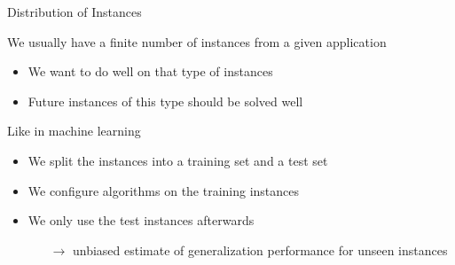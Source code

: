 \begin{frame}[c]{Distribution of Instances}

We usually have a finite number of instances from a given application
\begin{itemize}
\item We want to do well on that type of instances
\item Future instances of this type should be solved well 
\end{itemize}

\pause
\bigskip

Like in machine learning
\begin{itemize}
\item We split the instances into a \alert{training set} and a \alert{test set}
\item We configure algorithms on the training instances
\item We only use the test instances afterwards
\begin{itemize}
\item[$\to$] unbiased estimate of generalization performance for unseen instances
\end{itemize}  
\end{itemize}


\end{frame}
